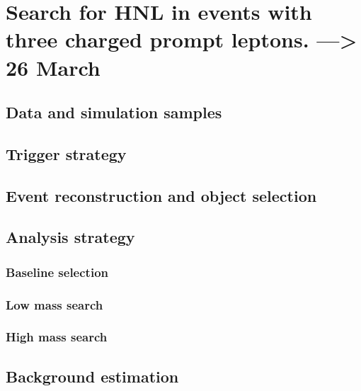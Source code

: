 
\chapter{Search for HNL in events with three charged prompt leptons. ---> 26 March} %

\label{Chapter4} %

\section{Data and simulation samples}

\section{Trigger strategy}
\section{Event reconstruction and object selection}
\section{Analysis strategy}
\subsection{Baseline selection}
\subsection{Low mass search}
\subsection{High mass search}

\section{Background estimation}
\subsection{}
\subsection{}
\subsection{}

